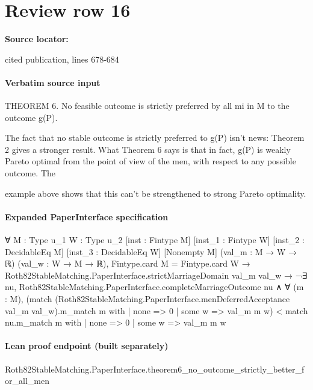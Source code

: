 \documentclass[10pt]{article}
\begin{document}
\section*{Review row 16}
\textbf{Source locator:} {\footnotesize\raggedright cited publication, lines 678-\allowbreak{}684\par}
\paragraph{Verbatim source input}
\begin{ReviewVerbatim}
THEOREM 6. No feasible outcome is strictly preferred by all mi in M to the outcome g(P).

The fact that no stable outcome is strictly preferred to g(P) isn't news: Theorem 2
gives a stronger result. What Theorem 6 says is that in fact, g(P) is weakly Pareto
optimal from the point of view of the men, with respect to any possible outcome. The

example above shows that this can't be strengthened to strong Pareto optimality.
\end{ReviewVerbatim}


\paragraph{Expanded PaperInterface specification}
\begin{ReviewVerbatim}
∀ {M : Type u_1} {W : Type u_2} [inst : Fintype M] [inst_1 : Fintype W] [inst_2 : DecidableEq M]
  [inst_3 : DecidableEq W] [Nonempty M] (val_m : M → W → ℝ) (val_w : W → M → ℝ),
  Fintype.card M = Fintype.card W →
    Roth82StableMatching.PaperInterface.strictMarriageDomain val_m val_w →
      ¬∃ nu,
          Roth82StableMatching.PaperInterface.completeMarriageOutcome nu ∧
            ∀ (m : M),
              (match (Roth82StableMatching.PaperInterface.menDeferredAcceptance val_m val_w).m_match m with
                | none => 0
                | some w => val_m m w) <
                match nu.m_match m with
                | none => 0
                | some w => val_m m w
\end{ReviewVerbatim}

\paragraph{Lean proof endpoint (built separately)}\begin{ReviewVerbatim}
Roth82StableMatching.PaperInterface.theorem6_no_outcome_strictly_better_for_all_men
\end{ReviewVerbatim}
\end{document}
